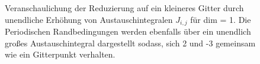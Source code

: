 \begin{figure}[h]
    \centering
    
    \caption{Veranschaulichung der Reduzierung auf ein kleineres Gitter durch unendliche Erhöhung von Austauschintegralen $J_{i,j}$ für dim = 1. Die Periodischen Randbedingungen werden ebenfalls über ein unendlich großes Austauschintegral dargestellt sodass, sich 2 und -3 gemeinsam wie ein Gitterpunkt verhalten.} \label{Abb: monotnie}
\end{figure}







